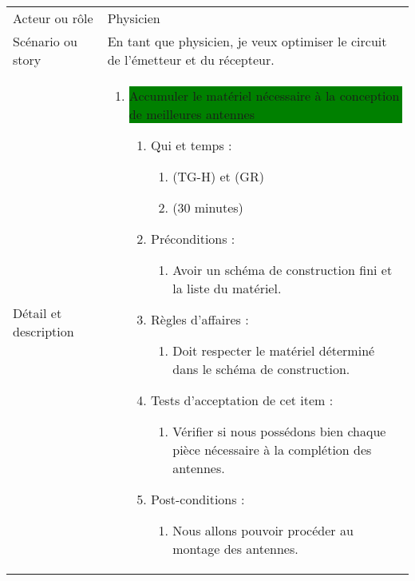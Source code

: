 \begin{longtable}{|l|p{}|}
\hline
    \rowcolor{Gray}
    \multicolumn{2}{|l|}{2} \\
\hline
    Acteur ou rôle & Physicien  \\
\hline
    Scénario ou story & En tant que physicien, je veux optimiser le circuit de l'émetteur et du récepteur. \\
\hline
    Détail et description &
        \begin{enumerate}[label*=\arabic*.]
            \item  \colorbox{Green}{\parbox{13cm}{ Accumuler le matériel nécessaire à la conception de meilleures antennes}}
            \begin{enumerate}[label*=\arabic*.]
                    \item Qui et temps :
                    \begin{enumerate}[label*=\arabic*.]
                        \item (TG-H) et (GR)
                        \item (30 minutes)
                    \end{enumerate}
                    \item Préconditions :
                    \begin{enumerate}[label*=\arabic*.]
                        \item Avoir un schéma de construction fini et la liste du matériel.
                    \end{enumerate}
                    \item Règles d’affaires :
                    \begin{enumerate}[label*=\arabic*.]
                        \item Doit respecter le matériel déterminé dans le schéma de construction.
                    \end{enumerate}
                    \item Tests d'acceptation de cet item :
                    \begin{enumerate}[label*=\arabic*.]
                        \item Vérifier si nous possédons bien chaque pièce nécessaire à la complétion des antennes.
                    \end{enumerate}
                    \item Post-conditions :
                    \begin{enumerate}[label*=\arabic*.]
                        \item Nous allons pouvoir procéder au montage des antennes.

\end{enumerate}
\end{enumerate}
\end{enumerate}
\end{longtable}
